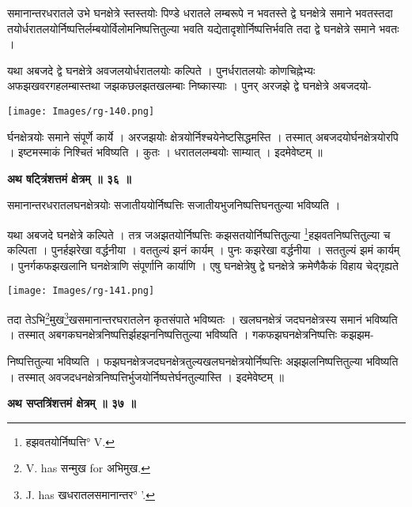 \documentclass[11pt, openany]{book}
\begin{document}
{\ab समानान्तरधरातले उभे घनक्षेत्रे स्तस्तयोः पिण्डे धरातले लम्बरूपे न भवतस्ते द्वे घनक्षेत्रे समाने भवतस्तदा तयोर्धरातलयोर्निष्पत्तिर्लम्बयोर्विलोमनिष्पत्तितुल्या भवति यद्येतादृशोर्निष्पत्तिर्भवति तदा द्वे घनक्षेत्रे समाने भवतः ।}\\
\vspace{5mm}

यथा अबजदे द्वे घनक्षेत्रे अवजलयोर्धरातलयोः कल्पिते । पुनर्धरातलयोः कोणचिह्नेभ्यः अफझखवरगहलम्बास्तथा जझकछलझतखलम्बाः निष्कास्याः । पुनर् अरजझे द्वे घनक्षेत्रे अबजदयो-

\newpage
\begin{center}
 \texttt{[image: Images/rg-140.png]}  
 \end{center}
र्घनक्षेत्रयोः समाने संपूर्णे कार्ये । अरजझयोः
क्षेत्रयोर्निश्चयेनेष्टसिद्धमस्ति । तस्मात् अबजदयोर्घनक्षेत्रयोरपि । इष्टमस्माकं निश्चितं भविष्यति । कुतः । धरातललम्बयोः साम्यात् । इदमेवेष्टम् ॥\\
\begin{center}
\textbf{\large अथ षट्त्रिंशत्तमं क्षेत्रम् ॥ ३६ ॥}
\end{center}
\vspace{5mm}

{\ab समानान्तरधरातलघनक्षेत्रयोः सजातीययोर्निष्पत्तिः सजातीयभुजनिष्पत्तिघनतुल्या भविष्यति ।}\\
\vspace{3mm}

 यथा अबजदे घनक्षेत्रे कल्पिते । तत्र जअझतयोर्निष्पत्तिः
कझसतयोर्निष्पत्तितुल्या \renewcommand{\thefootnote}{१}\footnote{हझवतयोर्निष्पत्ति° {\en V.}}हझवतनिष्पत्तितुल्या च कल्पिता ।
पुनर्हझरेखा वर्द्धनीया । वततुल्यं झनं कार्यम् । पुनः कझरेखा वर्द्धनीया
 । सततुल्यं झमं कार्यम् । पुनर्गकफझखलानि घनक्षेत्राणि संपूर्णानि कार्याणि । एषु घनक्षेत्रेषु द्वे घनक्षेत्रे क्रमेणैकैकं विहाय चेद्गृह्यते 
\begin{center}
 \texttt{[image: Images/rg-141.png]}  
 \end{center} 
तदा तेऽभि\renewcommand{\thefootnote}{२}\footnote{{\en V. has} सन्मुख {\en for} अभिमुख. }मुख\renewcommand{\thefootnote}{३}\footnote{{\en J. has} खधरातलसमानान्तर° '.}खसमानान्तरघरातलेन कृतसंपाते भविष्यतः । खलघनक्षेत्रं जदघनक्षेत्रस्य समानं भविष्यति । तस्मात् अबगकघनक्षेत्रनिष्पत्तिर्झहझननिष्पत्तितुल्या भविष्यति । गकफझघनक्षेत्रनिष्पत्तिः
कझझम-

\newpage
निष्पत्तितुल्या भविष्यति ।
फझघनक्षेत्रजदघनक्षेत्रतुल्यखलघनक्षेत्रयोर्निष्पत्तिः अझझलनिष्पत्तितुल्या भविष्यति । तस्मात् अवजदधनक्षेत्रनिष्पत्तिर्भुजयोर्निष्पत्तेर्घनतुल्यास्ति । इदमेवेष्टम् ॥\\
\begin{center}
\textbf{\large अथ सप्तत्रिंशत्तमं क्षेत्रम् ॥ ३७ ॥}
\end{center}
\vspace{2mm}
\end{document}

